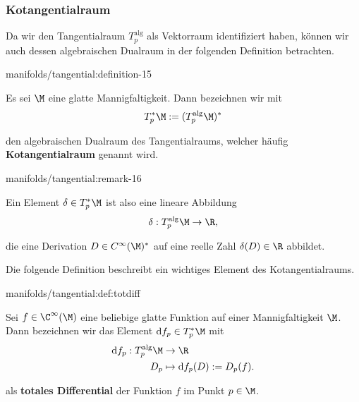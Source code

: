 \documentclass[letterpaper,10pt,german]{jupyterBook}
\begin{document}
\subsubsection{Kotangentialraum}
\label{\detokenize{manifolds/tangential:kotangentialraum}}
\par
Da wir den Tangentialraum \(T^{\text{alg}}_p\) als Vektorraum identifiziert haben, können wir auch dessen algebraischen Dualraum in der folgenden Definition betrachten.
\begin{definition}{}{manifolds/tangential:definition-15}



\par
Es sei \(\M\) eine glatte Mannigfaltigkeit.
Dann bezeichnen wir mit
\begin{align*}
T_p^\ast\M:= (T_p^{\text{alg}}\M)^\ast
\end{align*}
\par
den algebraischen Dualraum des Tangentialraums, welcher häufig \textbf{Kotangentialraum} genannt wird.
\end{definition}
\begin{remark}{}{manifolds/tangential:remark-16}



\par
Ein Element \(\delta\in T_p^\ast\M\) ist also eine lineare Abbildung
\begin{align*}
\delta: T_p^{\text{alg}}\M \to \R,
\end{align*}
\par
die eine Derivation \(D\in C^\infty(\M)^\ast\) auf eine reelle Zahl \(\delta(D)\in\R\) abbildet.
\end{remark}

\par
Die folgende Definition beschreibt ein wichtiges Element des Kotangentialraums.
\begin{definition}{}{manifolds/tangential:def:totdiff}



\par
Sei \(f\in\C^\infty(\M)\) eine beliebige glatte Funktion auf einer Mannigfaltigkeit \(\M\).
Dann bezeichnen wir das Element \(\mathrm{d}f_p \in T_p^\ast\M\) mit
\begin{align*}
\mathrm{d}f_p: T_p^{\text{alg}}\M &\to\R\\
D_p &\mapsto \mathrm{d}f_p(D):= D_p(f).
\end{align*}
\par
als \textbf{totales Differential} der Funktion \(f\) im Punkt \(p \in \M\).
\end{definition}
\end{document}

